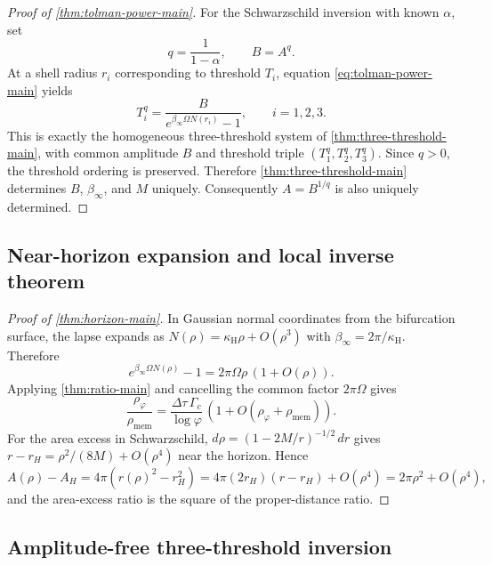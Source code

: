 \begin{proof}[Proof of \cref{thm:tolman-power-main}]
For the Schwarzschild inversion with known $\alpha$, set
\[
q=\frac{1}{1-\alpha},
\qquad
B=A^q.
\]
At a shell radius $r_i$ corresponding to threshold $T_i$, equation \eqref{eq:tolman-power-main} yields
\[
T_i^q
=
\frac{B}{e^{\beta_\infty\Omega N(r_i)}-1},
\qquad i=1,2,3.
\]
This is exactly the homogeneous three-threshold system of \cref{thm:three-threshold-main}, with common amplitude $B$ and threshold triple $(T_1^q,T_2^q,T_3^q)$. Since $q>0$, the threshold ordering is preserved. Therefore \cref{thm:three-threshold-main} determines $B$, $\beta_\infty$, and $M$ uniquely. Consequently $A=B^{1/q}$ is also uniquely determined.
\end{proof}

\subsection{Near-horizon expansion and local inverse theorem}

\begin{proof}[Proof of \cref{thm:horizon-main}]
In Gaussian normal coordinates from the bifurcation surface, the lapse expands as $N(\rho)=\kappa_{\mathrm H}\rho+O(\rho^3)$ with $\beta_\infty=2\pi/\kappa_{\mathrm H}$. Therefore
\[
e^{\beta_\infty\Omega N(\rho)}-1 = 2\pi\Omega\rho\,(1+O(\rho)).
\]
Applying \cref{thm:ratio-main} and cancelling the common factor $2\pi\Omega$ gives
\[
\frac{\rho_\varphi}{\rho_{\mathrm{mem}}} = \frac{\Delta\tau\,\Gamma_c}{\log\varphi}\,(1+O(\rho_\varphi+\rho_{\mathrm{mem}})).
\]
For the area excess in Schwarzschild, $d\rho=(1-2M/r)^{-1/2}\,dr$ gives $r-r_H=\rho^2/(8M)+O(\rho^4)$ near the horizon. Hence
\[
A(\rho)-A_H = 4\pi(r(\rho)^2-r_H^2) = 4\pi(2r_H)(r-r_H)+O(\rho^4) = 2\pi\rho^2+O(\rho^4),
\]
and the area-excess ratio is the square of the proper-distance ratio.
\end{proof}

\subsection{Amplitude-free three-threshold inversion}

